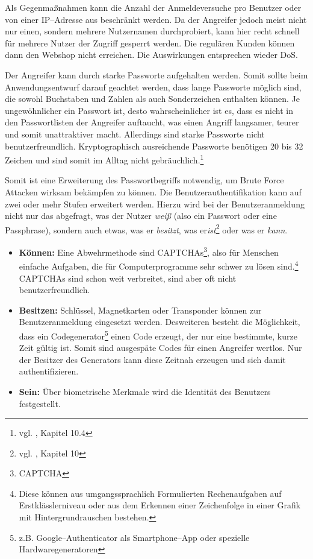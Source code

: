 Als Gegenmaßnahmen kann die Anzahl der Anmeldeversuche pro Benutzer oder von einer IP--Adresse aus beschränkt werden. Da der Angreifer jedoch meist nicht nur einen, sondern mehrere Nutzernamen durchprobiert, kann hier recht schnell für mehrere Nutzer der Zugriff gesperrt werden. Die regulären Kunden können dann den Webshop nicht erreichen. Die Auswirkungen entsprechen wieder \ac{DoS}.

Der Angreifer kann durch starke Passworte aufgehalten werden. Somit sollte beim Anwendungsentwurf darauf geachtet werden, dass lange Passworte möglich sind, die sowohl Buchstaben und Zahlen als auch Sonderzeichen enthalten können. Je ungewöhnlicher ein Passwort ist, desto wahrscheinlicher ist es, dass es nicht in den Passwortlisten der Angreifer auftaucht, was einen Angriff langsamer, teurer und somit unattraktiver macht. Allerdings sind starke Passworte nicht benutzerfreundlich. Kryptographisch ausreichende Passworte benötigen 20 bis 32 Zeichen und sind somit im Alltag nicht gebräuchlich.\footnote{vgl. \cite{kaufman}, Kapitel 10.4}

Somit ist eine Erweiterung des Passwortbegriffs notwendig, um Brute Force Attacken wirksam bekämpfen zu können. Die Benutzerauthentifikation kann auf zwei oder mehr Stufen erweitert werden. Hierzu wird bei der Benutzeranmeldung nicht nur das abgefragt, was der Nutzer \textit{weiß} (also ein Passwort oder eine Passphrase), sondern auch etwas, was er \textit{besitzt}, was er\textit{ist}\footnote{vgl. \cite{kaufman}, Kapitel 10} oder was er \textit{kann}.

\begin{itemize}
	
\item \textbf{Können:} Eine Abwehrmethode sind \acs{CAPTCHA}s\footnote{\ac{CAPTCHA}}, also für Menschen einfache Aufgaben, die für Computerprogramme sehr schwer zu lösen sind.\footnote{Diese können aus umgangssprachlich Formulierten Rechenaufgaben auf Erstklässlerniveau oder aus dem Erkennen einer Zeichenfolge in einer Grafik mit Hintergrundrauschen bestehen.} \ac{CAPTCHA}s sind schon weit verbreitet, sind aber oft nicht benutzerfreundlich.
\item \textbf{Besitzen:} Schlüssel, Magnetkarten oder Transponder können zur Benutzeranmeldung eingesetzt werden. Desweiteren besteht die Möglichkeit, dass ein Codegenerator\footnote{z.B. Google--Authenticator als Smartphone--App oder spezielle Hardwaregeneratoren} einen Code erzeugt, der nur eine bestimmte, kurze Zeit gültig ist. Somit sind ausgespäte Codes für einen Angreifer wertlos. Nur der Besitzer des Generators kann diese Zeitnah erzeugen und sich damit authentifizieren. 
\item \textbf{Sein:} Über biometrische Merkmale wird die Identität des Benutzers festgestellt.

\end{itemize}

